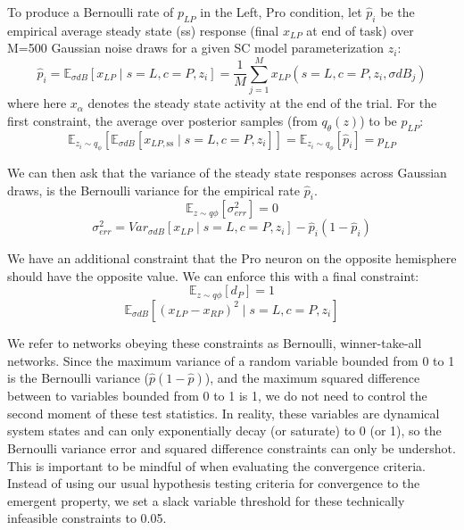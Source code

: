 \documentclass[11pt]{article}
\begin{document}
To produce a Bernoulli rate of $p_{LP}$ in the Left, Pro condition, let $\hat{p}_i$ be the empirical average steady state (ss) response (final $x_{LP}$ at end of task) over M=500 Gaussian noise draws for a given SC model parameterization $z_i$:
\begin{equation}
 \hat{p}_i = \mathbb{E}_{\sigma dB} \left[ x_{LP} \mid s=L, c=P, z_i \right] = \frac{1}{M}\sum_{j=1}^M x_{LP}(s=L, c=P, z_i, \sigma dB_j)
 \end{equation}
where here $x_\alpha$ denotes the steady state activity at the end of the trial.
For the first constraint, the average over posterior samples (from $q_\theta(z)$) to be $p_{LP}$:
\begin{equation}
\mathbb{E}_{z_i \sim q_\phi} \left[ \mathbb{E}_{\sigma dB} \left[ x_{LP,\text{ss}} \mid s=L, c=P, z_i \right] \right] = \mathbb{E}_{z_i \sim q_\phi} \left[ \hat{p}_i \right] = p_{LP}
\end{equation}

We can then ask that the variance of the steady state responses across Gaussian draws, is the Bernoulli variance for the empirical rate $\hat{p}_i$.
\begin{equation}
\mathbb{E}_{z \sim q\phi} \left[ \sigma^2_{err} \right] = 0
\end{equation}
\begin{equation}
\sigma^2_{err} = Var_{\sigma dB} \left[ x_{LP} \mid s=L, c=P, z_i \right] - \hat{p}_i(1 - \hat{p}_i)
\end{equation}

We have an additional constraint that the Pro neuron on the opposite hemisphere should have the opposite value.  We can enforce this with a final constraint:
\begin{equation}
\mathbb{E}_{z \sim q\phi} \left[ d_P \right] = 1
\end{equation}
\begin{equation}
\mathbb{E}_{\sigma dB} \left[ (x_{LP} - x_{RP})^2  \mid s=L, c=P, z_i \right]
\end{equation}

We refer to networks obeying these constraints as Bernoulli, winner-take-all networks.  Since the maximum variance of a random variable bounded from 0 to 1 is the Bernoulli variance ($\hat{p}(1-\hat{p})$), and the maximum squared difference between to variables bounded from 0 to 1 is 1, we do not need to control the second moment of these test statistics.  In reality, these variables are dynamical system states and can only exponentially decay (or saturate) to 0 (or 1), so the Bernoulli variance error and squared difference constraints can only be undershot.  This is important to be mindful of when evaluating the convergence criteria.  Instead of using our usual hypothesis testing criteria for convergence to the emergent property, we set a slack variable threshold for these technically infeasible constraints to 0.05.
\end{document}
